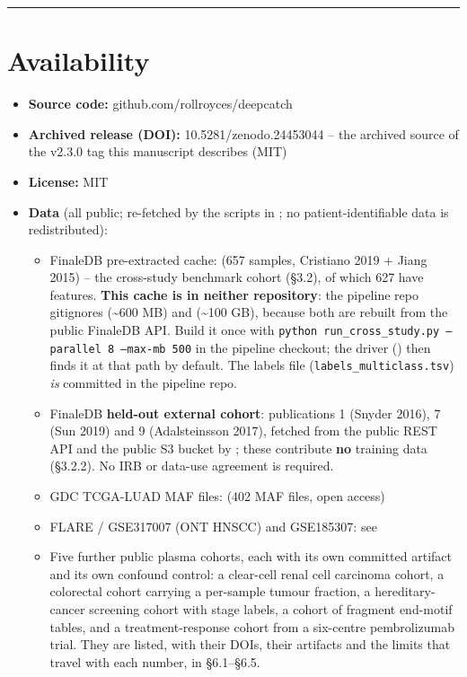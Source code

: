 \documentclass[11pt]{article}
\begin{document}
\par\bigskip\hrule\bigskip
\section{Availability}
\begin{itemize}
\item
\textbf{Source code:} github.com/rollroyces/deepcatch
\item
\textbf{Archived release (DOI):} 10.5281/zenodo.24453044 -- the archived source of the v2.3.0 tag this manuscript describes (MIT)
\item
\textbf{License:} MIT
\item
\textbf{Data} (all public; re-fetched by the scripts in ; no patient-identifiable data is redistributed):
\begin{itemize}
\item
FinaleDB pre-extracted cache:  (657 samples, Cristiano 2019 + Jiang 2015) -- the cross-study benchmark cohort (\S{}3.2), of which 627 have features. \textbf{This cache is in neither repository}: the pipeline repo gitignores  (\textasciitilde{}600 MB) and  (\textasciitilde{}100 GB), because both are rebuilt from the public FinaleDB API. Build it once with \texttt{python run\_\allowbreak{}cross\_\allowbreak{}study.py --parallel 8 --max-mb 500} in the pipeline checkout; the driver () then finds it at that path by default. The labels file (\texttt{labels\_\allowbreak{}multiclass.tsv}) \textit{is} committed in the pipeline repo.
\item
FinaleDB \textbf{held-out external cohort}: publications 1 (Snyder 2016), 7 (Sun 2019) and 9 (Adalsteinsson 2017), fetched from the public REST API and the public S3 bucket by ; these contribute \textbf{no} training data (\S{}3.2.2). No IRB or data-use agreement is required.
\item
GDC TCGA-LUAD MAF files:  (402 MAF files, open access)
\item
FLARE / GSE317007 (ONT HNSCC) and GSE185307: see 
\item
Five further public plasma cohorts, each with its own committed artifact and its own confound control: a clear-cell renal cell carcinoma cohort, a colorectal cohort carrying a per-sample tumour fraction, a hereditary-cancer screening cohort with stage labels, a cohort of fragment end-motif tables, and a treatment-response cohort from a six-centre pembrolizumab trial. They are listed, with their DOIs, their artifacts and the limits that travel with each number, in  \S{}6.1--\S{}6.5.

\end{itemize}
\end{itemize}
\end{document}
